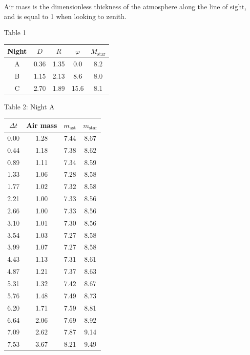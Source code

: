Air mass is the dimensionless thickness of the atmosphere along the line of
sight, and is equal to 1 when looking to zenith.

\begin{center}
Table 1

\begin{tabular}{c|c|c|c|c}
Night & $D$ & $R$ & $\varphi$ & $M_{\mathrm{star}}$ \\
\hline
A & 0.36 & 1.35 & 0.0  & 8.2 \\
B & 1.15 & 2.13 & 8.6  & 8.0 \\
C & 2.70 & 1.89 & 15.6 & 8.1 \\
\end{tabular}
\end{center}

\begin{center}
Table 2: Night A

\begin{tabular}{c|c|c|c}
$\Delta t$ & Air mass & $m_{\mathrm{ast}}$ & $m_{\mathrm{star}}$ \\
\hline
0.00 & 1.28 & 7.44 & 8.67 \\
0.44 & 1.18 & 7.38 & 8.62 \\
0.89 & 1.11 & 7.34 & 8.59 \\
1.33 & 1.06 & 7.28 & 8.58 \\
1.77 & 1.02 & 7.32 & 8.58 \\
2.21 & 1.00 & 7.33 & 8.56 \\
2.66 & 1.00 & 7.33 & 8.56 \\
3.10 & 1.01 & 7.30 & 8.56 \\
3.54 & 1.03 & 7.27 & 8.58 \\
3.99 & 1.07 & 7.27 & 8.58 \\
4.43 & 1.13 & 7.31 & 8.61 \\
4.87 & 1.21 & 7.37 & 8.63 \\
5.31 & 1.32 & 7.42 & 8.67 \\
5.76 & 1.48 & 7.49 & 8.73 \\
6.20 & 1.71 & 7.59 & 8.81 \\
6.64 & 2.06 & 7.69 & 8.92 \\
7.09 & 2.62 & 7.87 & 9.14 \\
7.53 & 3.67 & 8.21 & 9.49 \\
\end{tabular}
\end{center}

